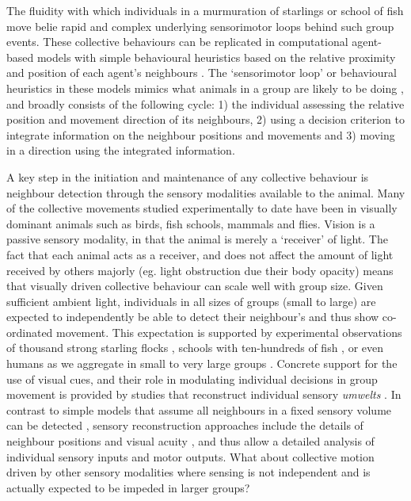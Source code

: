 \documentclass[
]{book}
\begin{document}
The fluidity with which individuals in a murmuration of starlings or school of fish move belie rapid and complex underlying sensorimotor loops behind such group events. These collective behaviours can be replicated in computational agent-based models with simple behavioural heuristics based on the relative proximity and position of each agent's neighbours \citep{reynolds1987a, couzin2002a}. The `sensorimotor loop' or behavioural heuristics in these models mimics what animals in a group are likely to be doing \citep{herbert2016understanding}, and broadly consists of the following cycle: 1) the individual assessing the relative position and movement direction of its neighbours, 2) using a decision criterion to integrate information on the neighbour positions and movements and 3) moving in a direction using the integrated information.

A key step in the initiation and maintenance of any collective behaviour is neighbour detection through the sensory modalities available to the animal. Many of the collective movements studied experimentally to date have been in visually dominant animals \citep{pita2016collective} such as birds, fish schools, mammals and flies. Vision is a passive sensory modality, in that the animal is merely a `receiver' of light. The fact that each animal acts as a receiver, and does not affect the amount of light received by others majorly (eg. light obstruction due their body opacity) means that visually driven collective behaviour can scale well with group size. Given sufficient ambient light, individuals in all sizes of groups (small to large) are expected to independently be able to detect their neighbour's and thus show co-ordinated movement. This expectation is supported by experimental observations of thousand strong starling flocks \citep{ballerini2008a}, schools with ten-hundreds of fish \citep{tunstrom2013collective}, or even humans as we aggregate in small to very large groups \citep{moussaid2011simple, dyer2009leadership}. Concrete support for the use of visual cues, and their role in modulating individual decisions in group movement is provided by studies that reconstruct individual sensory \emph{umwelts} \citep{turner2002encoding, strandburg2013visual, belden2019vision}. In contrast to simple models that assume all neighbours in a fixed sensory volume can be detected \citep{reynolds1987a, couzin2002a}, sensory reconstruction approaches include the details of neighbour positions and visual acuity \citep{strandburg2013visual, belden2019vision}, and thus allow a detailed analysis of individual sensory inputs and motor outputs. What about collective motion driven by other sensory modalities where sensing is not independent and is actually expected to be impeded in larger groups?
\end{document}
